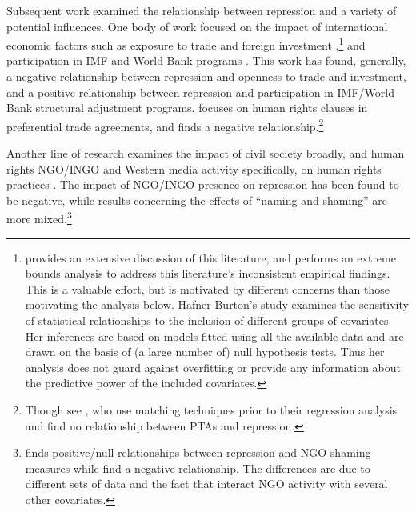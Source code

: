 \documentclass[12pt]{article}
\begin{document}
Subsequent work examined the relationship between repression and a variety of potential influences. One body of work focused on the impact of international economic factors such as exposure to trade and foreign investment \citep{Apodaca2001, RichardsGellenySacko2001, HafnerBurton2005jpr},\footnote{\citet{HafnerBurton2005jpr} provides an extensive discussion of this literature, and performs an extreme bounds analysis \citep{LeamerLeonard1983} to address this literature's inconsistent empirical findings. This is a valuable effort, but is motivated by different concerns than those motivating the analysis below. Hafner-Burton's study examines the sensitivity of statistical relationships to the inclusion of different groups of covariates. Her inferences are based on models fitted using all the available data and are drawn on the basis of (a large number of) null hypothesis tests. Thus her analysis does not guard against overfitting or provide any information about the predictive power of the included covariates.} and participation in IMF and World Bank programs \citep{AbouharbCingranelli2006, AbouharbCingranelli2007}. This work has found, generally, a negative relationship between repression and openness to trade and investment, and a positive relationship between repression and participation in IMF/World Bank structural adjustment programs. \citet{HafnerBurton2005io} focuses on human rights clauses in preferential trade agreements, and finds a negative relationship.\footnote{Though see \citet{SpilkerBohmelt2012}, who use matching techniques prior to their regression analysis and find no relationship between PTAs and repression.} 

Another line of research examines the impact of civil society broadly, and human rights NGO/INGO and Western media activity specifically, on human rights practices \citep{HafnerBurtonTsutsui2005,HafnerBurton2008,MurdieDavis2012}. The impact of NGO/INGO presence on repression has been found to be negative, while results concerning the effects of ``naming and shaming'' are more mixed.\footnote{\citet{HafnerBurton2008} finds positive/null relationships between repression and NGO shaming measures while \citet{MurdieDavis2012} find a negative relationship. The differences are due to different sets of data and the fact that \citet{MurdieDavis2012} interact NGO activity with several other covariates.} 
\end{document}
